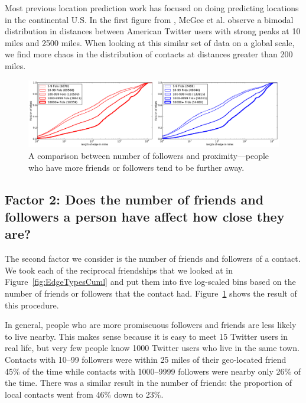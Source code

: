 \documentclass{sig-alternate}
\begin{document}
Most previous location prediction work has focused on doing predicting
locations in the continental U.S.
%
In the first figure from \cite{mcgee2011geographic}, McGee et al. observe a
bimodal distribution in distances between American Twitter users with strong
peaks at 10 miles and 2500 miles.
%
When looking at this similar set of data on a global scale, we find more chaos
in the distribution of contacts at distances greater than 200 miles.

\begin{figure}[tb]
\centering
\includegraphics[width=\linewidth]{figures/edge_counts.pdf}
\caption{
A comparison between number of followers and proximity---people who have more
friends or followers tend to be further away.
}
\label{fig:EdgeCounts}
\vspace{-2pt}
\end{figure}

\subsection{Factor 2: Does the number of friends and followers a person have affect how
close they are?}

The second factor we consider is the number of friends and followers of a contact.
%
%
%
We took each of the reciprocal friendships that we looked at in
Figure~\ref{fig:EdgeTypesCuml} and put them into five log-scaled bins based on
the number of friends or followers that the contact had.
%
Figure~\ref{fig:EdgeCounts} shows the result of this procedure.

In general, people who are more promiscuous followers and friends are less
likely to live nearby.
%
This makes sense because it is easy to meet 15 Twitter users in real life, but
very few people know 1000 Twitter users who live in the same town.
%
Contacts with 10--99 followers were within 25 miles of their geo-located friend
45\% of the time while contacts with 1000--9999 followers were nearby only 26\%
of the time.
%
There was a similar result in the number of friends: the proportion of local
contacts went from 46\% down to 23\%.
\end{document}
